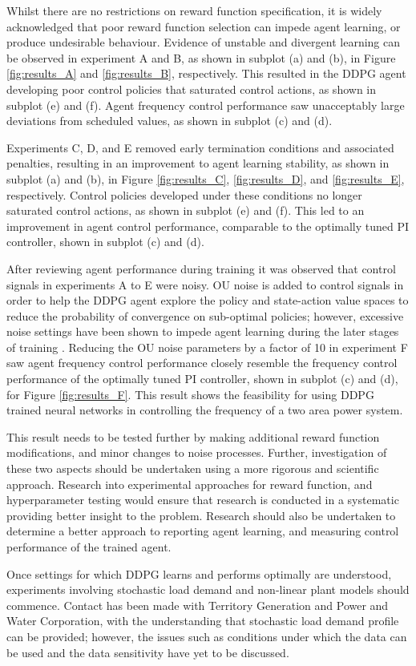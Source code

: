 Whilst there are no restrictions on reward function specification, it is widely acknowledged that poor reward function selection can impede agent learning, or produce undesirable behaviour. Evidence of unstable and divergent learning can be observed in experiment A and B, as shown in subplot (a) and (b), in Figure \ref{fig:results_A} and \ref{fig:results_B}, respectively. This resulted in the DDPG agent developing poor control policies that saturated control actions, as shown in subplot (e) and (f). Agent frequency control performance saw unacceptably large deviations from scheduled values, as shown in subplot (c) and (d).

Experiments C, D, and E removed early termination conditions and associated penalties, resulting in an improvement to agent learning stability, as shown in subplot (a) and (b), in Figure \ref{fig:results_C}, \ref{fig:results_D}, and \ref{fig:results_E}, respectively. Control policies developed under these conditions no longer saturated control actions, as shown in subplot (e) and (f). This led to an improvement in agent control performance, comparable to the optimally tuned PI controller, shown in subplot (c) and (d).

After reviewing agent performance during training it was observed that control signals in experiments A to E were noisy. OU noise is added to control signals in order to help the DDPG agent explore the policy and state-action value spaces to reduce the probability of convergence on sub-optimal policies; however, excessive noise settings have been shown to impede agent learning during the later stages of training \cite{}. Reducing the OU noise parameters by a factor of 10 in experiment F saw agent frequency control performance closely resemble the frequency control performance of the optimally tuned PI controller, shown in subplot (c) and (d), for Figure \ref{fig:results_F}. This result shows the feasibility for using DDPG trained neural networks in controlling the frequency of a two area power system.

This result needs to be tested further by making additional reward function modifications, and minor changes to noise processes. Further, investigation of these two aspects should be undertaken using a more rigorous and scientific approach. Research into experimental approaches for reward function, and hyperparameter testing would ensure that research is conducted in a systematic providing better insight to the problem. Research should also be undertaken to determine a better approach to reporting agent learning, and measuring control performance of the trained agent.

Once settings for which DDPG learns and performs optimally are understood, experiments involving stochastic load demand and non-linear plant models should commence. Contact has been made with Territory Generation and Power and Water Corporation, with the understanding that stochastic load demand profile can be provided; however, the issues such as conditions under which the data can be used and the data sensitivity have yet to be discussed.